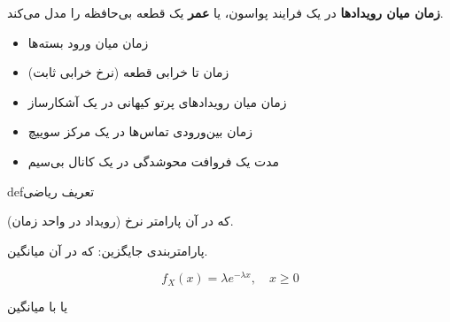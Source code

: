 \begin{Shaded}
\begin{Highlighting}[]
\NormalTok{(}\OperatorTok{,}\NormalTok{ (}\OperatorTok{+}\NormalTok{)}\OperatorTok{/}\OperatorTok{,} \NormalTok{(}\NormalTok{))}\OperatorTok{;}
\NormalTok{(}\OperatorTok{,}\NormalTok{ (}\OperatorTok{{-}}\NormalTok{)}\OperatorTok{\^{}}\OperatorTok{/}\OperatorTok{,} \NormalTok{(}\NormalTok{))}\OperatorTok{;}
\end{Highlighting}
\end{Shaded}



\textbf{زمان میان رویدادها} در یک فرایند پواسون، یا \textbf{عمر} یک قطعه بی‌حافظه را مدل می‌کند.


\begin{itemize}
\tightlist
\item
  زمان میان ورود بسته‌ها
\item
  زمان تا خرابی قطعه (نرخ خرابی ثابت)
\item
  زمان میان رویدادهای پرتو کیهانی در یک آشکارساز
\item
  زمان بین‌ورودی تماس‌ها در یک مرکز سوییچ
\item
  مدت یک فروافت محوشدگی در یک کانال بی‌سیم
\end{itemize}

\begin{PSbox}[unbreakable]{def}{تعریف ریاضی}

 که در آن \lr{\ensuremath{\lambda} =} پارامتر نرخ (رویداد در واحد زمان).

پارامتربندی جایگزین:  که در آن  میانگین.

\end{PSbox}


\[f_X(x) = \lambda e^{-\lambda x}, \quad x \geq 0\]

یا با میانگین 

